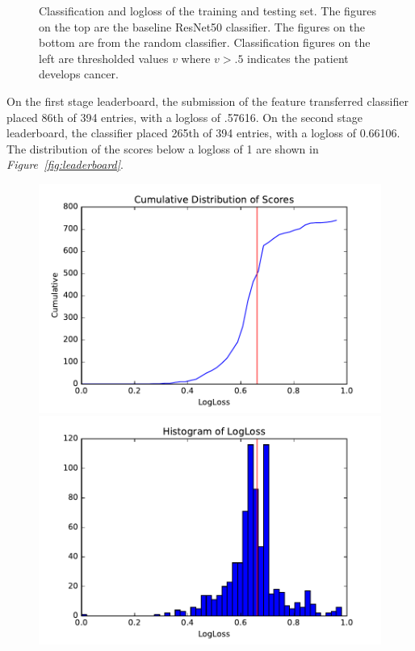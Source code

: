 \documentclass[conference,11pt]{IEEEtran}
\begin{document}
\begin{figure}[htb]
{      }
      \caption{Classification and logloss of the training and testing set. The figures on the top are the baseline ResNet50 classifier. The figures on the bottom are from the random classifier. Classification figures on the left are thresholded values $v$ where $v > .5$ indicates the patient develops cancer.}
      \label{fig:training}
\end{figure}

On the first stage leaderboard, the submission of the feature transferred classifier placed 86th of 394 entries, with a logloss of .57616. On the second stage leaderboard, the classifier placed 265th of 394 entries, with a logloss of 0.66106. The distribution of the scores below a logloss of 1 are shown in \textit{Figure~\ref{fig:leaderboard}}.

\begin{figure}[htb]
  \centering
  \begin{minipage}[c]{0.4\textwidth}
    \includegraphics[width=\textwidth]{figures/plot_leaderboard.pdf}
  \end{minipage}
  \begin{minipage}[c]{0.4\textwidth}
    \includegraphics[width=\textwidth]{figures/leaderboard_histogram.pdf}

\end{minipage}
\end{figure}
\end{document}
